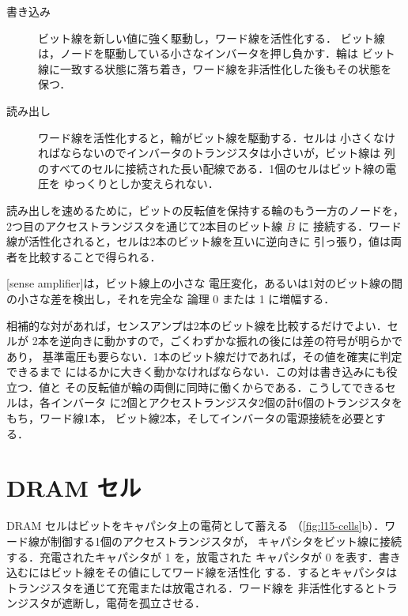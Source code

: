 \documentclass[../main.tex]{subfiles}
\begin{document}
\begin{description}
  \item[書き込み] ビット線を新しい値に強く駆動し，ワード線を活性化する．
    ビット線は，ノードを駆動している小さなインバータを押し負かす．輪は
    ビット線に一致する状態に落ち着き，ワード線を非活性化した後もその状態を
    保つ．
  \item[読み出し] ワード線を活性化すると，輪がビット線を駆動する．セルは
    小さくなければならないのでインバータのトランジスタは小さいが，ビット線は
    列のすべてのセルに接続された長い配線である．1個のセルはビット線の電圧を
    ゆっくりとしか変えられない．
\end{description}

読み出しを速めるために，ビットの反転値を保持する輪のもう一方のノードを，
2つ目のアクセストランジスタを通じて2本目のビット線 $\overline{B}$ に
接続する．ワード線が活性化されると，セルは2本のビット線を互いに逆向きに
引っ張り，値は両者を比較することで得られる．

\begin{definition}[センスアンプ]
  [sense amplifier]は，ビット線上の小さな
  電圧変化，あるいは1対のビット線の間の小さな差を検出し，それを完全な
  論理 0 または 1 に増幅する．
\end{definition}

相補的な対があれば，センスアンプは2本のビット線を比較するだけでよい．セルが
2本を逆向きに動かすので，ごくわずかな振れの後には差の符号が明らかであり，
基準電圧も要らない．1本のビット線だけであれば，その値を確実に判定できるまで
にはるかに大きく動かなければならない．この対は書き込みにも役立つ．値と
その反転値が輪の両側に同時に働くからである．こうしてできるセルは，各インバータ
に2個とアクセストランジスタ2個の計6個のトランジスタをもち，ワード線1本，
ビット線2本，そしてインバータの電源接続を必要とする．

\section{DRAM セル}
\label{sec:l15-dram}

DRAM セルはビットをキャパシタ上の電荷として蓄える
（\cref{fig:l15-cells}b）．ワード線が制御する1個のアクセストランジスタが，
キャパシタをビット線に接続する．充電されたキャパシタが 1 を，放電された
キャパシタが 0 を表す．書き込むにはビット線をその値にしてワード線を活性化
する．するとキャパシタはトランジスタを通じて充電または放電される．ワード線を
非活性化するとトランジスタが遮断し，電荷を孤立させる．
\end{document}
